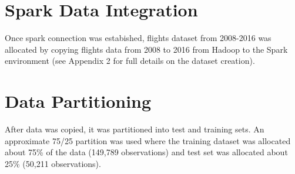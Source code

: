 \documentclass[12pt,twoside]{amherstthesis}
\begin{document}
  \section{Spark Data Integration}\label{spark-data-integration}
  
  Once spark connection was estabished, flights dataset from 2008-2016 was
  allocated by copying flights data from 2008 to 2016 from Hadoop to the
  Spark environment (see Appendix 2 for full details on the dataset
  creation).
  
  \begin{Shaded}
  \begin{Highlighting}[]
  \NormalTok{(}\NormalTok{)}
  \NormalTok{(}\NormalTok{)}
  \StringTok{ }\NormalTok{FullDatLog[}\NormalTok{(}
                                \NormalTok{, } \NormalTok{, }
                                 \NormalTok{),]}
  \StringTok{ }\NormalTok{, }
                         \NormalTok{)}
  
  \StringTok{ } 
  \StringTok{ }
  \end{Highlighting}
  \end{Shaded}
  
  \section{Data Partitioning}\label{data-partitioning}
  
  After data was copied, it was partitioned into test and training sets.
  An approximate 75/25 partition was used where the training dataset was
  allocated about 75\% of the data (149,789 observations) and test set was
  allocated about 25\% (50,211 observations).
  
\end{document}
